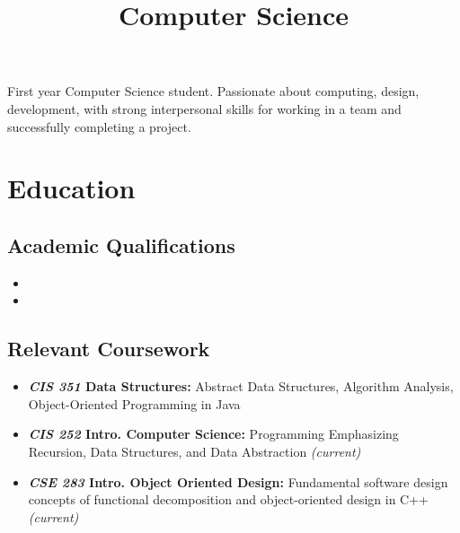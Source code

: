 \documentclass[11pt,a4paper,roman]{moderncv}        %
\title{Computer Science}                               %
\begin{document}
\makecvtitle

\small{First year Computer Science student.  Passionate about computing, design, development, with strong interpersonal skills for working in a team and successfully completing a project.}

\section{Education}

\vspace{5pt}

\subsection{Academic Qualifications}

\vspace{5pt}

\begin{itemize}

\item{}

\item{}

\end{itemize}

\vspace{2pt}

\subsection{Relevant Coursework}

\vspace{5pt}

\begin{itemize}

  \item{\textbf{\textit{CIS 351} Data Structures:} Abstract Data Structures, Algorithm Analysis, Object-Oriented Programming in Java}
  \item{\textbf{\textit{CIS 252} Intro. Computer Science:} Programming Emphasizing Recursion, Data Structures, and Data Abstraction \textit{(current)}}
  \item{\textbf{\textit{CSE 283} Intro. Object Oriented Design:} Fundamental software design concepts of functional decomposition and object-oriented design in C++ \textit{(current)}}

\end{itemize}
\end{document}
